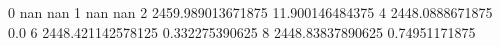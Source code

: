 0 nan nan
1 nan nan
2 2459.989013671875 11.900146484375
4 2448.0888671875 0.0
6 2448.421142578125 0.332275390625
8 2448.83837890625 0.74951171875
